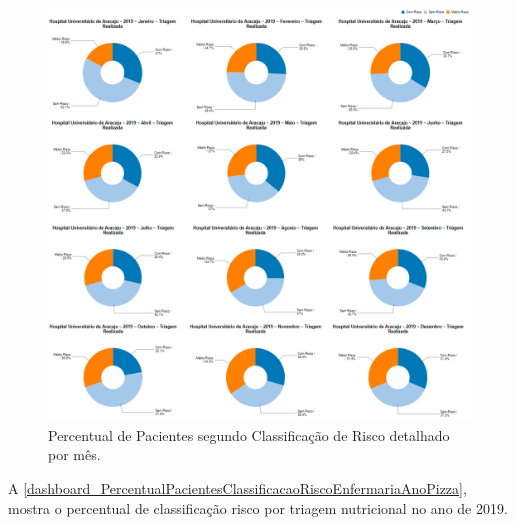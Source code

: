 \begin{figure}[htb]
	\caption{\label{dashboard_PercentualPacientesClassificacaoRiscoHospitalMesPizza}Percentual de Pacientes segundo Classificação de Risco detalhado por mês.}
	\begin{center}
	    \includegraphics[scale=0.25]{Imagens/2.2.PercentualPacientesClassificacaoRiscoHospitalMesPizza.png}
	\end{center}
\end{figure}

\clearpage
A \autoref{dashboard_PercentualPacientesClassificacaoRiscoEnfermariaAnoPizza}, mostra o percentual de classificação risco por triagem nutricional no ano de 2019.

